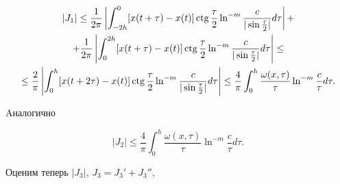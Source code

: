 \begin{multline}


|J_1| \leq


\frac{1}{2 \pi} \left| \int_{- 2h}^{0} [x(t+\tau)-x(t)] \ctg \frac{\tau}{2}


\ln^{-m}\frac{c}{|\sin \frac{\tau}{2}|} d\tau \right| + \\


%


+\frac{1}{2 \pi} \left| \int_{0}^{2h} [x(t+\tau)-x(t)] \ctg \frac{\tau}{2}


\ln^{-m}\frac{c}{|\sin \frac{\tau}{2}|} d\tau \right| \leq \\


%


\leq


\frac{2}{\pi} \left| \int_{0}^{h} [x(t+2\tau)-x(t)] \ctg \frac{\tau}{2}


\ln^{-m}\frac{c}{|\sin \frac{\tau}{2}|} d\tau \right| \leq


\frac{4}{\pi} \int_0^h \frac{\omega(x,\tau)}{\tau}


\ln^{-m}\frac{c}{\tau} d\tau.


\end{multline}


Aналогично


\begin{equation}


|J_2| \leq \frac{4}{\pi} \int_0^h


\frac{\omega(x,\tau)}{\tau} \ln^{-m}\frac{c}{\tau} d\tau. \tag{4$'$}


\end{equation}


Оценим теперь $|J_3|$, $J_3 = J_3'+J_3''$,


